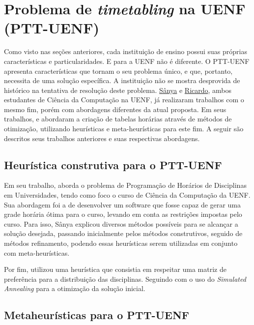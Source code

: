 \section{Problema de \textit{timetabling} na UENF (PTT-UENF)} \label{sec:anteriores}                               %

Como visto nas seções anteriores, cada instituição de ensino possui suas próprias características e particularidades. E para a UENF não é diferente. O PTT-UENF apresenta características que tornam o seu problema único, e que, portanto, necessita de uma solução específica. A instituição não se mostra desprovida de histórico na tentativa de resolução deste problema. \hyperref[ssec:sanya]{Sânya} e \hyperref[ssec:ricardo]{Ricardo}, ambos estudantes de Ciência da Computação na UENF, já realizaram trabalhos com o mesmo fim, porém com abordagens diferentes da atual proposta. Em seus trabalhos,  e  abordaram a criação de tabelas horárias através de métodos de otimização, utilizando heurísticas e meta-heurísticas para este fim. A seguir são descritos seus trabalhos anteriores e suas respectivas abordagens.

\subsection{Heurística construtiva para o PTT-UENF} \label{ssec:sanya}     %

Em seu trabalho,  aborda o problema de Programação de Horários de Disciplinas em Universidades, tendo como foco o curso de Ciência da Computação da UENF. Sua abordagem foi a de desenvolver um software que fosse capaz de gerar uma grade horária ótima para o curso, levando em conta as restrições impostas pelo curso. Para isso, Sânya explicou diversos métodos possíveis para se alcançar a solução desejada, passando inicialmente pelos métodos construtivos, seguido de métodos refinamento, podendo essas heurísticas serem utilizadas em conjunto com meta-heurísticas.

Por fim, utilizou uma heurística que consistia em respeitar uma matriz de preferência para a distribuição das disciplinas. Seguindo com o uso do \textit{Simulated Annealing} para a otimização da solução inicial.

\subsection{Metaheurísticas para o PTT-UENF} \label{ssec:ricardo}   %


